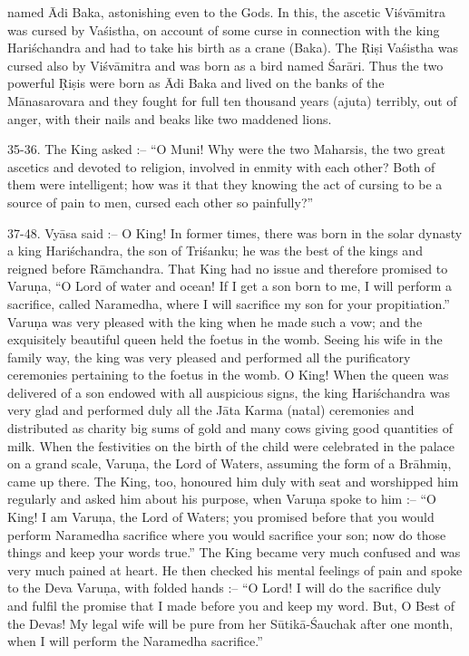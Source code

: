 named \=Adi Baka, astonishing even to the Gods. In this, the ascetic Vi\'sv\=amitra was cursed by Va\'sistha, on account of some curse in connection with the king Hari\'schandra and had to take his birth as a crane (Baka). The \d{R}i\d{s}i Va\'sistha was cursed also by Vi\'sv\=amitra and was born as a bird named \'Sar\=ari. Thus the two powerful \d{R}i\d{s}is were born as \=Adi Baka and lived on the banks of the M\=anasarovara and they fought for full ten thousand years (ajuta) terribly, out of anger, with their nails and beaks like two maddened lions.

35-36. The King asked :-- ``O Muni! Why were the two Maharsis, the two great ascetics and devoted to religion, involved in enmity with each other? Both of them were intelligent; how was it that they knowing the act of cursing to be a source of pain to men, cursed each other so painfully?''

37-48. Vy\=asa said :-- O King! In former times, there was born in the solar dynasty a king Hari\'schandra, the son of Tri\'sanku; he was the best of the kings and reigned before R\=amchandra. That King had no issue and therefore promised to Varu\d{n}a, ``O Lord of water and ocean! If I get a son born to me, I will perform a sacrifice, called Naramedha, where I will sacrifice my son for your propitiation.'' Varu\d{n}a was very pleased with the king when he made such a vow; and the exquisitely beautiful queen held the foetus in the womb. Seeing his wife in the family way, the king was very pleased and performed all the purificatory ceremonies pertaining to the foetus in the womb. O King! When the queen was delivered of a son endowed with all auspicious signs, the king Hari\'schandra was very glad and performed duly all the J\=ata Karma (natal) ceremonies and distributed as charity big sums of gold and many cows giving good quantities of milk. When the festivities on the birth of the child were celebrated in the palace on a grand scale, Varu\d{n}a, the Lord of Waters, assuming the form of a Br\=ahmi\d{n}, came up there. The King, too, honoured him duly with seat and worshipped him regularly and asked him about his purpose, when Varu\d{n}a spoke to him :-- ``O King! I am Varu\d{n}a, the Lord of Waters; you promised before that you would perform Naramedha sacrifice where you would sacrifice your son; now do those things and keep your words true.'' The King became very much confused and was very much pained at heart. He then checked his mental feelings of pain and spoke to the Deva Varu\d{n}a, with folded hands :-- ``O Lord! I will do the sacrifice duly and fulfil the promise that I made before you and keep my word. But, O Best of the Devas! My legal wife will be pure from her S\=utik\=a-\'Sauchak after one month, when I will perform the Naramedha sacrifice.''


